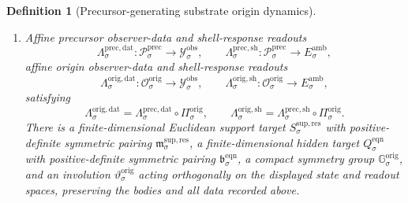 \documentclass[11pt]{article}
\newcommand{\DataSpace}[1]{\mathcal Y_{#1}^{\mathrm{obs}}}
\newcommand{\AmbientTarget}[1]{E_{#1}^{\mathrm{amb}}}
\newcommand{\ResTarget}[1]{S_{#1}^{\mathrm{sup,res}}}
\newcommand{\ResPair}[1]{\mathfrak m_{#1}^{\mathrm{sup,res}}}
\newcommand{\SubBody}[1]{\mathcal B_{#1}^{\mathrm{sub}}}
\newcommand{\LiftBody}[1]{\mathcal B_{#1}^{\mathrm{lift}}}
\newcommand{\LiftProj}[1]{\Pi_{#1}^{\mathrm{lift}}}
\newcommand{\LiftSelect}[1]{\mathfrak s_{#1}^{\mathrm{lift}}}
\newcommand{\LiftFunctional}[1]{\mathscr V_{#1}^{\mathrm{lift}}}
\newcommand{\PrecSpace}[1]{\mathcal P_{#1}^{\mathrm{prec}}}
\newcommand{\PrecProj}[1]{\Pi_{#1}^{\mathrm{prec}}}
\newcommand{\PrecData}[1]{\Lambda_{#1}^{\mathrm{prec,dat}}}
\newcommand{\PrecShellMap}[1]{\Lambda_{#1}^{\mathrm{prec,sh}}}
\newcommand{\OrigSpace}[1]{\mathcal O_{#1}^{\mathrm{orig}}}
\newcommand{\OrigProj}[1]{\Pi_{#1}^{\mathrm{orig}}}
\newcommand{\OrigData}[1]{\Lambda_{#1}^{\mathrm{orig,dat}}}
\newcommand{\OrigShellMap}[1]{\Lambda_{#1}^{\mathrm{orig,sh}}}
\newcommand{\OrigSym}[1]{\mathbb G_{#1}^{\mathrm{orig}}}
\newcommand{\OrigTime}[1]{\vartheta_{#1}^{\mathrm{orig}}}
\newcommand{\OrigShellSet}[1]{\mathcal Z_{#1}^{\mathrm{orig}}}
\newcommand{\EqnTarget}[1]{Q_{#1}^{\mathrm{eqn}}}
\newcommand{\EqnPair}[1]{\mathfrak b_{#1}^{\mathrm{eqn}}}
\newtheorem{definition}{Definition}
\begin{document}
\begin{definition}[Precursor-generating substrate origin dynamics]
\begin{enumerate}
    \begin{equation}
    \LiftFunctional{\sigma}(\ell)
    \ge
    \LiftFunctional{\sigma}\bigl(\LiftSelect{\sigma}(m)\bigr)
    +
    \mu_{\sigma}^{\mathrm{fib}}\,
    \operatorname{dist}\bigl(\ell,\LiftSelect{\sigma}(m)\bigr)^{2}
    \label{eq:origfibergap}
    \end{equation}
    for every \(m\in\SubBody{\sigma}\) and every \(\ell\in(\LiftProj{\sigma})^{-1}(m)\cap\LiftBody{\sigma}\), and
    \begin{equation}
    \LiftFunctional{\sigma}\bigl(\LiftSelect{\sigma}(m)\bigr)
    \ge
    \mu_{\sigma}^{\mathrm{sub}}\,
    \operatorname{dist}\bigl(
    m,
    \LiftProj{\sigma}(\PrecProj{\sigma}(\OrigProj{\sigma}(\OrigShellSet{\sigma})))
    \bigr)^{2}
    \label{eq:origprojectedgap}
    \end{equation}
    for all \(m\in\SubBody{\sigma}\).

    \item Affine precursor observer-data and shell-response readouts
    \[
    \PrecData{\sigma}:\PrecSpace{\sigma}\to\DataSpace{\sigma},
    \qquad
    \PrecShellMap{\sigma}:\PrecSpace{\sigma}\to\AmbientTarget{\sigma},
    \]
    affine origin observer-data and shell-response readouts
    \[
    \OrigData{\sigma}:\OrigSpace{\sigma}\to\DataSpace{\sigma},
    \qquad
    \OrigShellMap{\sigma}:\OrigSpace{\sigma}\to\AmbientTarget{\sigma},
    \]
    satisfying
    \begin{equation}
    \OrigData{\sigma}
    =
    \PrecData{\sigma}\circ\OrigProj{\sigma},
    \qquad
    \OrigShellMap{\sigma}
    =
    \PrecShellMap{\sigma}\circ\OrigProj{\sigma}.
    \label{eq:origfactor}
    \end{equation}
    There is a finite-dimensional Euclidean support target \(\ResTarget{\sigma}\) with positive-definite symmetric pairing \(\ResPair{\sigma}\), a finite-dimensional hidden target \(\EqnTarget{\sigma}\) with positive-definite symmetric pairing \(\EqnPair{\sigma}\), a compact symmetry group \(\OrigSym{\sigma}\), and an involution \(\OrigTime{\sigma}\) acting orthogonally on the displayed state and readout spaces, preserving the bodies and all data recorded above.


\end{enumerate}
\end{definition}
\end{document}
